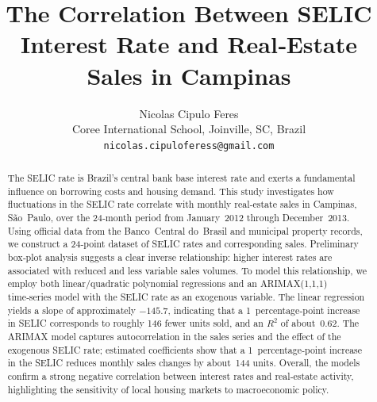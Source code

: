 \documentclass[10pt]{article}
\title{\fontsize{18}{22}\selectfont\textbf{The Correlation Between SELIC Interest Rate and Real‑Estate Sales in Campinas}}
\author{Nicolas Cipulo Feres\\Coree International School, Joinville, SC, Brazil\\\texttt{nicolas.cipuloferess@gmail.com}}
\date{}
\begin{document}
\maketitle

\begin{abstract}
The SELIC rate is Brazil’s central bank base interest rate and exerts a fundamental influence on borrowing costs and housing demand.  This study investigates how fluctuations in the SELIC rate correlate with monthly real‑estate sales in Campinas, São Paulo, over the 24‑month period from January 2012 through December 2013.  Using official data from the Banco Central do Brasil and municipal property records, we construct a 24‑point dataset of SELIC rates and corresponding sales.  Preliminary box‑plot analysis suggests a clear inverse relationship: higher interest rates are associated with reduced and less variable sales volumes.  To model this relationship, we employ both linear/quadratic polynomial regressions and an ARIMAX(1,1,1) time‑series model with the SELIC rate as an exogenous variable.  The linear regression yields a slope of approximately \(-145.7\), indicating that a 1 percentage‑point increase in SELIC corresponds to roughly 146 fewer units sold, and an \(R^2\) of about 0.62.  The ARIMAX model captures autocorrelation in the sales series and the effect of the exogenous SELIC rate; estimated coefficients show that a 1 percentage‑point increase in the SELIC reduces monthly sales changes by about 144 units.  Overall, the models confirm a strong negative correlation between interest rates and real‑estate activity, highlighting the sensitivity of local housing markets to macroeconomic policy.
\end{abstract}

\usepackage{titlesec}
\end{document}
